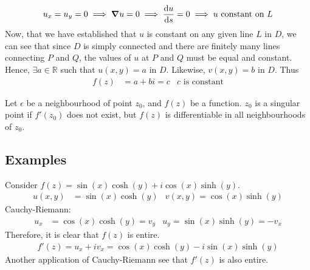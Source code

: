 \documentclass[12pt, english]{book}
\makeatletter
\renewenvironment{proof}[1][\proofname]{\par
	\pushQED{\qed}%
	\normalfont \topsep6\p@\@plus6\p@\relax
	\list{}{%
		\settowidth{\leftmargin}{\itshape\proofname:\hskip\labelsep}%
		\setlength{\labelwidth}{0pt}%
		\setlength{\itemindent}{-\leftmargin}%
		}%
	\item[\hskip\labelsep\itshape#1\@addpunct{:}]\ignorespaces
	}{\popQED\endlist\@endpefalse}
\makeatother
\begin{document}
\begin{proof}
\begin{align*}
			u_x = u_y = 0 \implies \grad{u} = 0 \implies \dv{u}{s} = 0 
			\implies u \text{ constant on } L
		\end{align*}
		Now, that we have established that \(u\) is constant on any given line \(L\) in \(D\), we can see that since \(D\) is simply connected and there are finitely many lines connecting \(P\) and \(Q\), the values of \(u\) at \(P\) and \(Q\) must be equal and constant. Hence, \(\exists a \in \mathbb{R}\) such that \(u(x,y) = a \) in \(D\). Likewise, \(v(x,y) = b\) in \(D\). Thus
		\begin{align*}
			f(z) &= a + bi = c & c \text{ is constant}
		\end{align*}
	\end{proof}
	
	\begin{definition} 
		\label{Singular Point Definition - Complex}
		Let \(\epsilon\) be a neighbourhood of point \(z_0\), and \(f(z)\) be a function. \(z_0\) is a singular point if \(f'(z_0)\) does not exist, but \(f(z)\) is differentiable in all neighbourhoods of \(z_0\).
	\end{definition}
	
	\subsection{Examples} \label{Analytic Functions Examples Subsection - Complex}
	
	\begin{example}
		Consider \(f(z) = \sin(x)\cosh(y) + i\cos(x)\sinh(y) \).
		\begin{align*}
			u(x,y) &= \sin(x)\cosh(y)	& 	v(x,y) = \cos(x)\sinh(y)
		\end{align*}
		Cauchy-Riemann:
		\begin{align*}
			u_x &= \cos(x)\cosh(y) = v_y	&	u_y = \sin(x)\sinh(y) = -v_x
		\end{align*}
		Therefore, it is clear that \(f(z)\) is entire.
		\begin{align*}
			f'(z) = u_x + iv_x = \cos(x)\cosh(y) - i\sin(x)\sinh(y) 
		\end{align*}
		Another application of Cauchy-Riemann see that \(f'(z)\) is also entire.
	\end{example}
\end{document}
